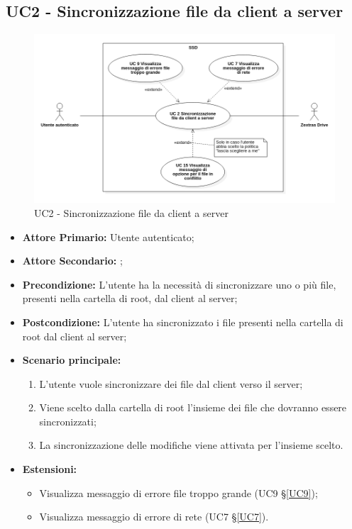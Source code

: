 \subsection{UC2 - Sincronizzazione file da client a server}
\label{UC2}
\begin{figure}[H]
    \centering
    \includegraphics[scale = 0.5]{components/img/UC2.png}
    \caption{UC2 - Sincronizzazione file da client a server}
\end{figure}
\begin{itemize}
\item \textbf{Attore Primario:} Utente autenticato;
\item \textbf{Attore Secondario:} ;
\item \textbf{Precondizione:} L'utente ha la necessità di sincronizzare uno o più file, presenti nella cartella di root, dal client al server;
\item \textbf{Postcondizione:} L'utente ha sincronizzato i file presenti nella cartella di root dal client al server;
\item \textbf{Scenario principale:}
\begin{enumerate}
\item L'utente vuole sincronizzare dei file dal client verso il server;
\item Viene scelto dalla cartella di root l'insieme dei file che dovranno essere sincronizzati;
\item La sincronizzazione delle modifiche viene attivata per l'insieme scelto.
\end{enumerate}
\item \textbf{Estensioni:}
    \begin{itemize}
    \item Visualizza messaggio di errore file troppo grande (UC9 \S{}\ref{UC9});
    \item Visualizza messaggio di errore di rete (UC7 \S{}\ref{UC7}).
    \end{itemize}
\end{itemize}
